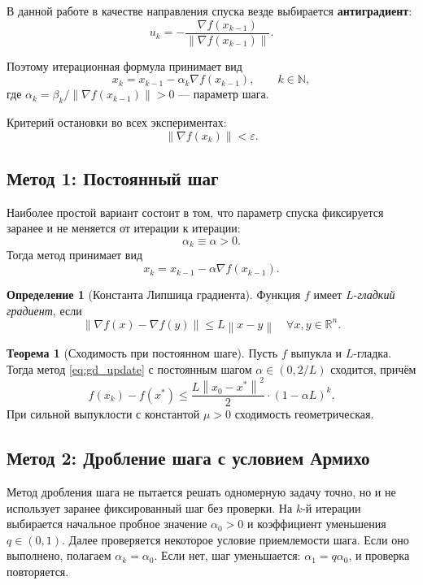 \documentclass[a4paper,12pt]{article}
\newcommand{\R}{\mathbb{R}}
\newcommand{\norm}[1]{\left\|#1\right\|}
\newcommand{\grad}{\nabla}
\newcommand{\eps}{\varepsilon}
\theoremstyle{definition}
\newtheorem{definition}{Определение}[section]
\newtheorem{theorem}{Теорема}[section]
\begin{document}
В данной работе в качестве направления спуска везде выбирается \textbf{антиградиент}:
\[
    u_k = -\frac{\grad f(x_{k-1})}{\norm{\grad f(x_{k-1})}}.
\]

Поэтому итерационная формула принимает вид
\begin{equation}
    \label{eq:gd_update}
    x_k = x_{k-1} - \alpha_k \grad f(x_{k-1}), \qquad k \in \mathbb{N},
\end{equation}
где $\alpha_k = \beta_k / \norm{\grad f(x_{k-1})} > 0$ — параметр шага.

Критерий остановки во всех экспериментах:
\[
    \norm{\grad f(x_k)} < \eps.
\]

\subsection{Метод 1: Постоянный шаг}

Наиболее простой вариант состоит в том, что параметр спуска фиксируется заранее и не меняется от итерации к итерации:
\[
    \alpha_k \equiv \alpha > 0.
\]
Тогда метод принимает вид
\[
    x_k = x_{k-1} - \alpha \grad f(x_{k-1}).
\]

\begin{definition}[Константа Липшица градиента]
    Функция $f$ имеет $L$-\emph{гладкий градиент}, если
    \[
        \norm{\grad f(x) - \grad f(y)} \leq L\norm{x - y}
        \quad \forall x, y \in \R^n.
    \]
\end{definition}

\begin{theorem}[Сходимость при постоянном шаге]
    Пусть $f$ выпукла и $L$-гладка. Тогда метод \eqref{eq:gd_update}
    с постоянным шагом $\alpha \in (0, 2/L)$ сходится, причём
    \[
        f(x_k) - f(x^*) \leq \frac{L\norm{x_0 - x^*}^2}{2}\cdot(1 - \alpha L)^k.
    \]
    При сильной выпуклости с константой $\mu > 0$ сходимость геометрическая.
\end{theorem}

\subsection{Метод 2: Дробление шага с условием Армихо}

Метод дробления шага не пытается решать одномерную задачу точно, но и не использует заранее фиксированный шаг без проверки. На $k$-й итерации выбирается начальное пробное значение $\alpha_0 > 0$ и коэффициент уменьшения $q \in (0,1)$. Далее проверяется некоторое условие приемлемости шага. Если оно выполнено, полагаем $\alpha_k = \alpha_0$. Если нет, шаг уменьшается: $\alpha_1 = q \alpha_0$, и проверка повторяется.
\end{document}
